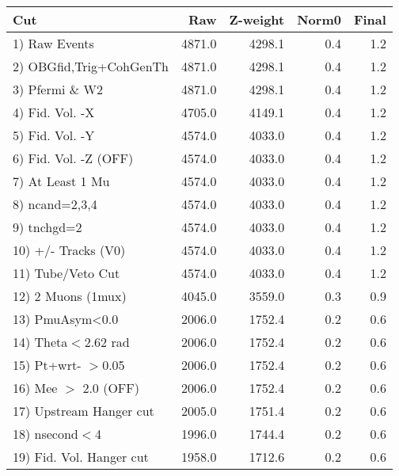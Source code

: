  \begin{table}[h!]\centering
 \begin{tabular}{||l||r|r|r|r||}
 \hline
 \hline
 Cut & Raw & Z-weight & Norm0 & Final \\
 \hline
  1) Raw Events           &      4871.0 &      4298.1 &         0.4 &         1.2 \\
  2) OBGfid,Trig+CohGenTh &      4871.0 &      4298.1 &         0.4 &         1.2 \\
  3) Pfermi \& W2         &      4871.0 &      4298.1 &         0.4 &         1.2 \\
  4) Fid. Vol. -X         &      4705.0 &      4149.1 &         0.4 &         1.2 \\
  5) Fid. Vol. -Y         &      4574.0 &      4033.0 &         0.4 &         1.2 \\
  6) Fid. Vol. -Z (OFF)   &      4574.0 &      4033.0 &         0.4 &         1.2 \\
  7) At Least 1 Mu        &      4574.0 &      4033.0 &         0.4 &         1.2 \\
  8) ncand=2,3,4          &      4574.0 &      4033.0 &         0.4 &         1.2 \\
  9) tnchgd=2             &      4574.0 &      4033.0 &         0.4 &         1.2 \\
 10) +/- Tracks (V0)      &      4574.0 &      4033.0 &         0.4 &         1.2 \\
 11) Tube/Veto Cut        &      4574.0 &      4033.0 &         0.4 &         1.2 \\
 12) 2 Muons (1mux)       &      4045.0 &      3559.0 &         0.3 &         0.9 \\
 13) PmuAsym<0.0          &      2006.0 &      1752.4 &         0.2 &         0.6 \\
 14) Theta$<$2.62 rad     &      2006.0 &      1752.4 &         0.2 &         0.6 \\
 15) Pt+wrt- $>$0.05      &      2006.0 &      1752.4 &         0.2 &         0.6 \\
 16) Mee $>$ 2.0  (OFF)   &      2006.0 &      1752.4 &         0.2 &         0.6 \\
 17) Upstream Hanger cut  &      2005.0 &      1751.4 &         0.2 &         0.6 \\
 18) nsecond$<$4          &      1996.0 &      1744.4 &         0.2 &         0.6 \\
 19) Fid. Vol. Hanger cut &      1958.0 &      1712.6 &         0.2 &         0.6 \\

\end{tabular}
\end{table}
